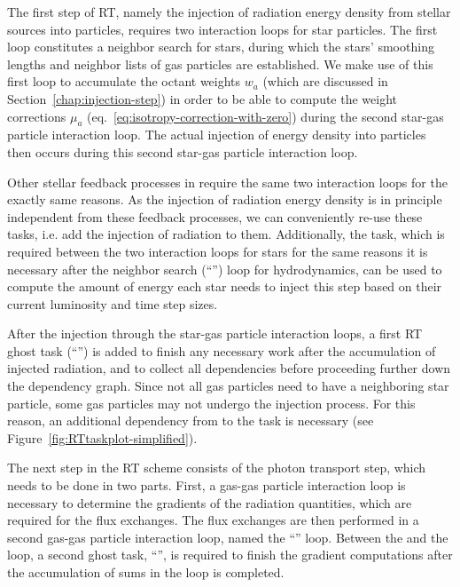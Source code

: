 The first step of RT, namely the injection of radiation energy density from stellar sources into
particles, requires two interaction loops for star particles. The first loop constitutes a neighbor
search for stars, during which the stars' smoothing lengths and neighbor lists of gas particles are
established. We make use of this first loop to accumulate the octant weights $w_a$ (which are
discussed in Section~\ref{chap:injection-step}) in order to be able to compute the weight
corrections $\mu_a$ (eq.~\ref{eq:isotropy-correction-with-zero}) during the second star-gas particle
interaction loop. The actual injection of energy density into particles then occurs during this
second star-gas particle interaction loop.

Other stellar feedback processes in \swift require the same two interaction loops for the exactly
same reasons. As the injection of radiation energy density is in principle independent from these
feedback processes, we can conveniently re-use these tasks, i.e. add the injection of radiation to
them. Additionally, the  task, which is required between the two interaction
loops for stars for the same reasons it is necessary after the neighbor search (``'')
loop for hydrodynamics, can be used to compute the amount of energy each star needs to inject this
step based on their current luminosity and time step sizes.

After the injection through the star-gas particle interaction loops, a first RT ghost task
(``'') is added to finish any necessary work after the accumulation of injected
radiation, and to collect all dependencies before proceeding further down the dependency graph.
Since not all gas particles need to have a neighboring star particle, some gas particles may not
undergo the injection process. For this reason, an additional dependency from  to the
 task is necessary (see Figure~\ref{fig:RTtaskplot-simplified}).

The next step in the RT scheme consists of the photon transport step, which needs to be done in two
parts. First, a gas-gas particle interaction loop is necessary to determine the gradients of the
radiation quantities, which are required for the flux exchanges. The flux exchanges are then
performed in a second gas-gas particle interaction loop, named the ``'' loop.
Between the  and the  loop, a second ghost task,
``'', is required to finish the gradient computations after the accumulation of
sums in the  loop is completed.

